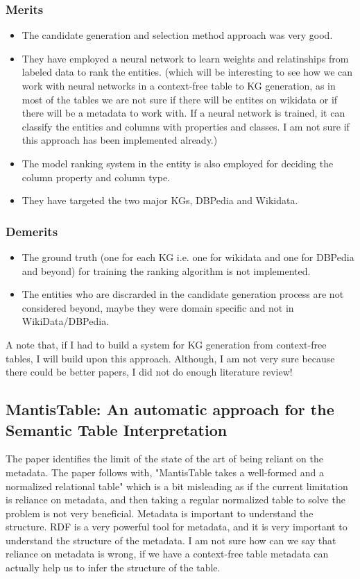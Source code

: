 \documentclass[runningheads]{llncs}
\begin{document}
\subsubsection*{Merits}
\begin{itemize}
    \item The candidate generation and selection method approach was very good. 
    \item They have employed a neural network to learn weights and relatinships from labeled data to rank the entities. (which will be interesting to see how 
    we can work with neural networks in a context-free table to KG generation, as in most of the tables we are not sure if there will be
    entites on wikidata or if there will be a metadata to work with. If a neural network is trained, it can classify the entities and columns with properties and classes.
     I am not sure if this approach has been implemented already.)
    \item The model ranking system in the entity is also employed for deciding the column property and column type.
    \item They have targeted the two major KGs, DBPedia and Wikidata.
\end{itemize}
\subsubsection*{Demerits}
\begin{itemize}
    \item The ground truth (one for each KG i.e. one for wikidata and one for DBPedia and beyond) for training the ranking algorithm is not implemented.
    \item The entities who are discrarded in the candidate generation process are not considered beyond, maybe they were domain specific and not in WikiData/DBPedia.
\end{itemize}
A note that, if I had to build a system for KG generation from context-free tables, I will build upon this approach. Although, I am not very sure because there could be better papers,
I did not do enough literature review!
\subsection{MantisTable: An automatic approach for the Semantic Table Interpretation} 
The paper identifies the limit of the state of the art of being reliant on the metadata. The paper follows with, "MantisTable takes a well-formed and a normalized relational table" which is a
bit misleading as if the current limitation is reliance on metadata, and then taking a regular normalized table to solve the problem is not very beneficial. Metadata is important to understand the structure.
RDF is a very powerful tool for metadata, and it is very important to understand the structure of the metadata. I am not sure how can we say that reliance on metadata is wrong, if we have a context-free table 
metadata can actually help us to infer the structure of the table.
\end{document}
